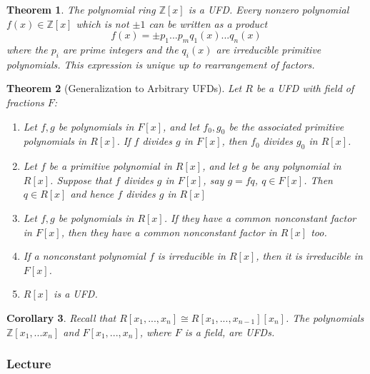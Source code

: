 \documentclass[12pt]{article}
\newtheorem{thm}{Theorem}[section]
\newtheorem{cor}[thm]{Corollary}
\theoremstyle{definition}
\theoremstyle{remark}
\numberwithin{equation}{section}
\newcommand\Z{\mathbb Z}    %
\begin{document}
\vspace{15pt}

\begin{thm}
        The polynomial ring $\Z[x]$ is a UFD. Every nonzero polynomial $f(x) \in \Z[x]$ which is not $\pm 1$ can be written as a product \begin{equation}
                f(x) = \pm p_1...p_mq_1(x)...q_n(x)
        \end{equation}
        where the $p_i$ are prime integers and the $q_i(x)$ are irreducible primitive polynomials. This expression is unique up to rearrangement of factors.
\end{thm}

\vspace{15pt}


\begin{thm}[Generalization to Arbitrary UFDs]
        Let $R$ be a UFD with field of fractions $F$:\begin{enumerate}
                \item Let $f,g$ be polynomials in $F[x]$, and let $f_0,g_0$ be the associated primitive polynomials in $R[x]$. If $f$ divides $g$ in $F[x]$, then $f_0$ divides $g_0$ in $R[x]$.
                \item Let $f$ be a primitive polynomial in $R[x]$, and let $g$ be any polynomial in $R[x]$. Suppose that $f$ divides $g$ in $F[x]$, say $g = fq$, $q \in F[x]$. Then $q \in R[x]$ and hence $f$ divides $g$ in $R[x]$
                \item Let $f,g$ be polynomials in $R[x]$. If they have a common nonconstant factor in $F[x]$, then they have a common nonconstant factor in $R[x]$ too.
                \item If a nonconstant polynomial $f$ is irreducible in $R[x]$, then it is irreducible in $F[x]$.
                \item $R[x]$ is a UFD.
        \end{enumerate}
\end{thm}


\vspace{15pt}

\begin{cor}
        Recall that $R[x_1,...,x_n] \cong R[x_1,...,x_{n-1}][x_n]$. The polynomials $\Z[x_1,...x_n]$ and $F[x_1,...,x_n]$, where $F$ is a field, are UFDs.
\end{cor}


\vspace{15pt}

\subsubsection{Lecture}
\end{document}
